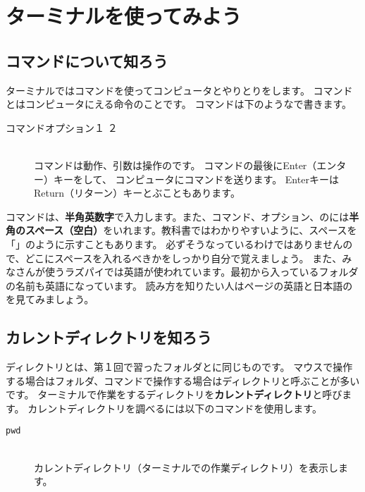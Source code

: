 
\section{ターミナルを使ってみよう}
\subsection{コマンドについて知ろう}

ターミナルではコマンドを使ってコンピュータとやりとりをします。
コマンドとはコンピュータにえる命令のことです。
コマンドは下のようなで書きます。

\begin{description}
\item[コマンド\textvisiblespace オプション\textvisiblespace {}１\textvisiblespace 
{}２]\mbox{}\\
コマンドは動作、引数は操作のです。
 コマンドの最後にEnter（エンター）キーをして、
 コンピュータにコマンドを送ります。
 EnterキーはReturn（リターン）キーとぶこともあります。
\end{description}

コマンドは、{\bf 半角英数字}で入力します。また、コマンド、オプション、のには{\bf 半角のスペース（空白）}をいれます。教科書ではわかりやすいように、スペースを「\textvisiblespace 」のように示すこともあります。
必ずそうなっているわけではありませんので、どこにスペースを入れるべきかをしっかり自分で覚えましょう。
また、みなさんが使うラズパイでは英語が使われています。最初から入っているフォルダの名前も英語になっています。
読み方を知りたい人は\pageref{英語と日本語の対応表}ページの英語と日本語のを見てみましょう。

\subsection{カレントディレクトリを知ろう}
ディレクトリとは、第１回で習ったフォルダとに同じものです。
マウスで操作する場合はフォルダ、コマンドで操作する場合はディレクトリと呼ぶことが多いです。
ターミナルで作業をするディレクトリを{\bf カレントディレクトリ}と呼びます。
カレントディレクトリを調べるには以下のコマンドを使用します。

\begin{description}
\item[\texttt{pwd}]\mbox{}\\
 カレントディレクトリ（ターミナルでの作業ディレクトリ）を表示します。
\end{description}

